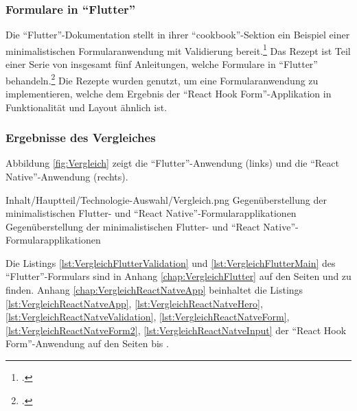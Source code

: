 \subsubsection{Formulare in \enquote{Flutter}}
Die \enquote{Flutter}-Dokumentation stellt in ihrer \enquote{cookbook}-Sektion ein Beispiel einer minimalistischen Formularanwendung mit Validierung bereit.\footcite[Vgl.][]{BuildAFormWithValidation}
Das Rezept ist Teil einer Serie von insgesamt fünf Anleitungen, welche Formulare in \enquote{Flutter} behandeln.\footcite[Vgl.][]{FormsFlutter}
Die Rezepte wurden genutzt,
um eine Formularanwendung zu implementieren,
welche dem Ergebnis der \enquote{React Hook Form}-Applikation in Funktionalität und Layout ähnlich ist.

\clearpage
\subsubsection{Ergebnisse des Vergleiches}


Abbildung \ref{fig:Vergleich} zeigt die \enquote{Flutter}-Anwendung (links) und die \enquote{React Native}-Anwendung (rechts).

\begin{alexfigure}{Inhalt/Hauptteil/Technologie-Auswahl/Vergleich.png}
   {Gegenüberstellung der minimalistischen {Flutter}- und \enquote{React Native}-Formular\-ap\-pli\-ka\-ti\-on\-en}
   {Gegenüberstellung der minimalistischen {Flutter}- und \enquote{React Native}-Formular\-ap\-pli\-ka\-ti\-on\-en}
 
   \label{fig:Vergleich}
 
 \end{alexfigure}

 Die Listings \ref{lst:VergleichFlutterValidation} und \ref{lst:VergleichFlutterMain}
 des \enquote{Flutter}-Formulars sind in Anhang \ref{chap:VergleichFlutter}
 auf den Seiten \pageref{lst:VergleichFlutterValidation} und \pageref{lst:VergleichFlutterMain} zu finden.
 Anhang \ref{chap:VergleichReactNatveApp} beinhaltet die Listings
 \ref{lst:VergleichReactNatveApp}, \ref{lst:VergleichReactNatveHero}, \ref{lst:VergleichReactNatveValidation},
 \ref{lst:VergleichReactNatveForm},  \ref{lst:VergleichReactNatveForm2}, \ref{lst:VergleichReactNatveInput} 
 der \enquote{React Hook Form}-Anwendung auf den Seiten \pageref{lst:VergleichReactNatveApp} bis \pageref{lst:VergleichReactNatveInput}.

